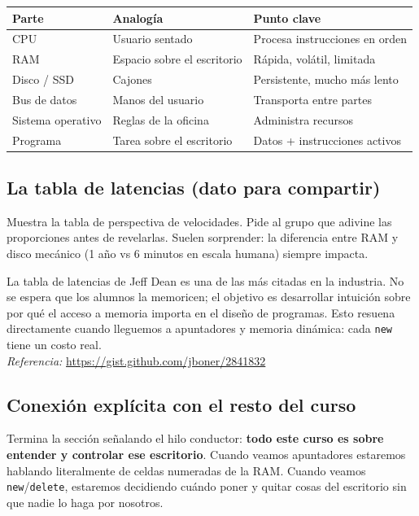 \documentclass[12pt, oneside]{article}
\begin{document}
\begin{center}
\begin{tabular}{lll}
  \toprule
  \textbf{Parte} & \textbf{Analogía} & \textbf{Punto clave} \\
  \midrule
  CPU              & Usuario sentado          & Procesa instrucciones en orden \\
  RAM              & Espacio sobre el escritorio & Rápida, volátil, limitada \\
  Disco / SSD      & Cajones                  & Persistente, mucho más lento \\
  Bus de datos     & Manos del usuario        & Transporta entre partes \\
  Sistema operativo& Reglas de la oficina     & Administra recursos \\
  Programa         & Tarea sobre el escritorio& Datos + instrucciones activos \\
  \bottomrule
\end{tabular}
\end{center}

\subsection{La tabla de latencias (dato para compartir)}

Muestra la tabla de perspectiva de velocidades. Pide al grupo que adivine
las proporciones antes de revelarlas. Suelen sorprender: la diferencia entre
RAM y disco mecánico (1 año vs 6 minutos en escala humana) siempre impacta.

\begin{notaprofesor}
  La tabla de latencias de Jeff Dean es una de las más citadas en la industria.
  No se espera que los alumnos la memoricen; el objetivo es desarrollar
  intuición sobre por qué el acceso a memoria importa en el diseño de programas.
  Esto resuena directamente cuando lleguemos a apuntadores y memoria dinámica:
  cada \texttt{new} tiene un costo real.\\
  \textit{Referencia:} \url{https://gist.github.com/jboner/2841832}
\end{notaprofesor}

\subsection{Conexión explícita con el resto del curso}

Termina la sección señalando el hilo conductor: \textbf{todo este curso es
sobre entender y controlar ese escritorio}. Cuando veamos apuntadores estaremos
hablando literalmente de celdas numeradas de la RAM. Cuando veamos
\texttt{new}/\texttt{delete}, estaremos decidiendo cuándo poner y quitar
cosas del escritorio sin que nadie lo haga por nosotros.
\end{document}
